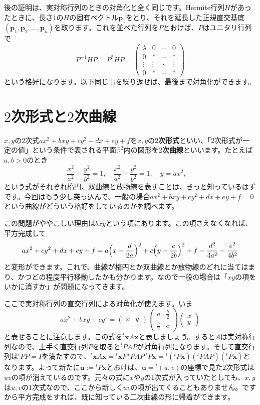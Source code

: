 後の証明は、実対称行列のときの対角化と全く同じです。Hermite行列$H$があったときに、長さ$1$の$H$の固有ベクトル$\bm{p}_1$をとり、それを延長した正規直交基底$(\bm{p}_1, \bm{p}_2, \ldots, \bm{p}_n)$を取ります。これを並べた行列を$P$とおけば、$P$はユニタリ行列で
\[
P^{-1} H P = P^* H P =
\begin{pmatrix}
\lambda & 0 & \cdots & 0 \\
0 & * & \cdots & * \\
\vdots & \vdots & \ddots & \vdots \\
0 & * & \cdots & *
\end{pmatrix}
\]
という格好になります。以下同じ事を繰り返せば、最後まで対角化ができます。

\section{$2$次形式と$2$次曲線}

$x, y$の$2$次式$ax^2 + bxy + cy^2 + dx + ey + f$を$x, y$の\textbf{$2$次形式}といい、「$2$次形式が一定の値」という条件で表される平面$\mathbb{R}^2$内の図形を\textbf{$2$次曲線}といいます。たとえば$a, b > 0$のとき
\[
\frac{x^2}{a^2} + \frac{y^2}{b^2} = 1, \quad
\frac{x^2}{a^2} - \frac{y^2}{b^2} = 1, \quad
y = a x^2, \quad
\]
という式がそれぞれ楕円、双曲線と放物線を表すことは、きっと知っているはずです。今回はもう少し突っ込んで、一般の場合$ax^2 + bxy + cy^2 + dx + ey + f = 0$という曲線がどういう格好をしているのかを調べます。

この問題がややこしい理由は$bxy$という項にあります。この項さえなくなれば、平方完成して
\[
ax^2 + cy^2 + dx + ey + f = a \Bigl(x + \frac{d}{2a}\Bigr)^2 + c \Bigl(y + \frac{e}{2b}\Bigr)^2 + f - \frac{d^2}{4a^2} - \frac{e^2}{4b^2}
\]
と変形ができます。これで、曲線が楕円とか双曲線とか放物線のどれに当てはまり、かつどの程度平行移動したかも分かります。なので一般の場合は「$xy$の項をいかに消すか」が問題になってきます。

ここで実対称行列の直交行列による対角化が使えます。いま
\[
ax^2 + bxy + cy^z
=
\begin{pmatrix}
x & y
\end{pmatrix}
\begin{pmatrix}
a & \frac{b}{2} \\
\frac{b}{2} & c
\end{pmatrix}
\begin{pmatrix}
x \\
y
\end{pmatrix}
\]
と表せることに注意します。この式を${}^t\bm{x} A \bm{x}$と表しましょう。すると$A$は実対称行列なので、上手く直交行列$P$を取ると${}^tP A P$が対角行列になります。そして直交行列は${}^tP P = I$を満たすので、${}^t\bm{x} A \bm{x} = {}^t\bm{x} P\, {}^tP A P\, {}^t P \bm{x} =  {}^t({}^tP\bm{x}) ({}^tP A P) ({}^tP\bm{x})$となります。よって新たに$\bm{u} := {}^tP \bm{x}$とおけば、$\bm{u} = {}^t(u, v)$の座標で見た$2$次形式は$uv$の項が消えているのです。元々の式に$x$や$y$の$1$次式が入っていたとしても、$x, y$は$u, v$の$1$次式なので、ここから新しく$uv$の項が出てくることもありません。ですから平方完成をすれば、既に知っている二次曲線の形に帰着ができます。

